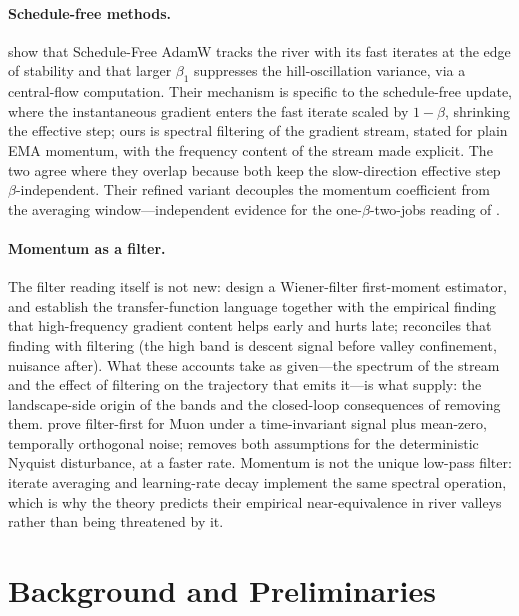 \documentclass[11pt,a4paper]{article}
\theoremstyle{remark}
\begin{document}
\paragraph{Schedule-free methods.} \citet{song2025river} show that Schedule-Free AdamW \citep{defazio2024road} tracks the river with its fast iterates at the edge of stability and that larger $\beta_1$ suppresses the hill-oscillation variance, via a central-flow computation.
Their mechanism is specific to the schedule-free update, where the instantaneous gradient enters the fast iterate scaled by $1-\beta$, shrinking the effective step; ours is spectral filtering of the gradient stream, stated for plain EMA momentum, with the frequency content of the stream made explicit.
The two agree where they overlap because both keep the slow-direction effective step $\beta$-independent.
Their refined variant decouples the momentum coefficient from the averaging window---independent evidence for the one-$\beta$-two-jobs reading of .

\paragraph{Momentum as a filter.} The filter reading itself is not new: \citet{yao2023signal} design a Wiener-filter first-moment estimator, and \citet{li2025frequency} establish the transfer-function language together with the empirical finding that high-frequency gradient content helps early and hurts late;  reconciles that finding with filtering (the high band is descent signal before valley confinement, nuisance after).
What these accounts take as given---the spectrum of the stream and the effect of filtering on the trajectory that emits it---is what  supply: the landscape-side origin of the bands and the closed-loop consequences of removing them.
\citet{li2026denoise} prove filter-first for Muon under a time-invariant signal plus mean-zero, temporally orthogonal noise;  removes both assumptions for the deterministic Nyquist disturbance, at a faster rate.
Momentum is not the unique low-pass filter: iterate averaging \citep{defazio2024road} and learning-rate decay \citep{wen2024river} implement the same spectral operation, which is why the theory predicts their empirical near-equivalence in river valleys rather than being threatened by it.

\section{Background and Preliminaries}
\label{sec:background}
\end{document}
